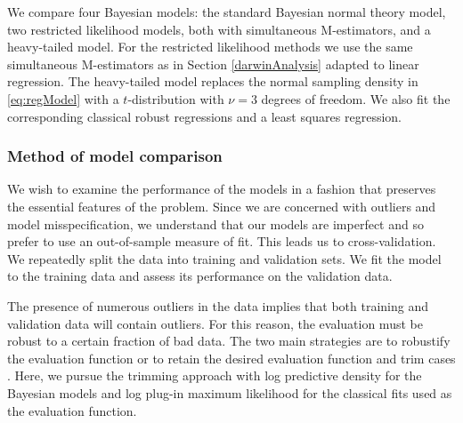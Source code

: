 \documentclass[12pt]{article}
\begin{document}
We compare four Bayesian models: the standard Bayesian normal theory model, two restricted likelihood models, both with simultaneous M-estimators, and a heavy-tailed model.  For the restricted likelihood methods we use the same simultaneous M-estimators as in Section \ref{darwinAnalysis} adapted to linear regression.  The heavy-tailed model replaces the normal sampling density in \eqref{eq:regModel} with a $t$-distribution with $\nu = 3$ degrees of freedom. %
We also fit the corresponding classical robust regressions and a least squares regression.  

\subsubsection{Method of model comparison}
We wish to examine the performance of the models in a fashion that preserves the essential features of the 
problem.  Since we are concerned with outliers and model 
misspecification, we understand that our models are imperfect and so prefer to use an out-of-sample measure of fit.  
This leads us to cross-validation.  We repeatedly split the data into training
and validation sets.  We fit the model to the training data and assess its performance on the validation data.  

The presence of numerous outliers in the data implies that both training and validation data will contain 
outliers.  For this reason, the evaluation must be robust to a certain fraction of bad data.  
The two main strategies are to robustify the evaluation function \citep[e.g.,][]{ronchetti1997} or 
to retain the desired evaluation function and trim cases \citep{jung2014}.  Here,
we pursue the trimming approach with log predictive density for the Bayesian models and log plug-in 
maximum likelihood for the classical fits used as the evaluation function.
\end{document}
